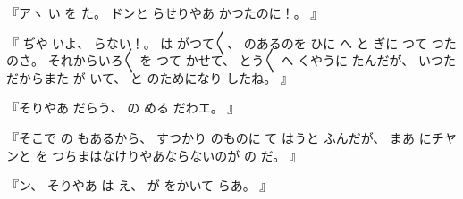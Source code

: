 %
『アヽ
い
を
た。
%
ドンと
らせりやあ
かつたのに！。
』

%
『
ぢや
いよ、
%
らない！。
%
は
がつて〳〵{}、
%
のあるのを
ひに
へ
と
ぎに
つて
つたのさ。
%
それからいろ〳〵
を
つて
かせて、
%
とう〳〵
へ
くやうに
たんだが、
%
いつた
だからまた
が
いて、
%
と
のためになり
したね。
』

%
『そりやあ
だらう、
%
の
める
だわエ。
』

%
『そこで
の
もあるから、
%
すつかり
のものに
て
はうと
ふんだが、
%
まあ
にチヤンと
を
つちまはなけりやあならないのが
の
だ。
』

%
『ン、
%
そりやあ
は
え、
%
が
をかいて
らあ。
』
